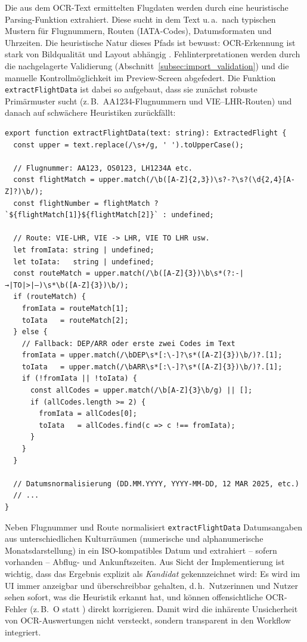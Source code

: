 Die aus dem OCR-Text ermittelten Flugdaten werden durch eine heuristische Parsing-Funktion extrahiert.
Diese sucht in dem Text u.\,a.\ nach typischen Mustern für Flugnummern, Routen (IATA-Codes), Datumsformaten und Uhrzeiten.
Die heuristische Natur dieses Pfads ist bewusst: OCR-Erkennung ist stark von Bildqualität und Layout abhängig \cite{mlKitTextRecognition,tesseractOcr}.
Fehlinterpretationen werden durch die nachgelagerte Validierung (Abschnitt~\ref{subsec:import_validation}) und die manuelle Kontrollmöglichkeit im Preview-Screen abgefedert.
Die Funktion \texttt{extractFlightData} ist dabei so aufgebaut, dass sie zunächst robuste Primärmuster sucht (z.\,B.\ \glqq AA1234\grqq{}-Flugnummern und \glqq VIE--LHR\grqq{}-Routen) und danach auf schwächere Heuristiken zurückfällt:

\begin{lstlisting}[caption={Heuristische Extraktion von Flugdaten aus OCR-Text (services/ocr.ts)},label={lst:extract_flight_data}]
export function extractFlightData(text: string): ExtractedFlight {
  const upper = text.replace(/\s+/g, ' ').toUpperCase();

  // Flugnummer: AA123, OS0123, LH1234A etc.
  const flightMatch = upper.match(/\b([A-Z]{2,3})\s?-?\s?(\d{2,4}[A-Z]?)\b/);
  const flightNumber = flightMatch ? `${flightMatch[1]}${flightMatch[2]}` : undefined;

  // Route: VIE-LHR, VIE -> LHR, VIE TO LHR usw.
  let fromIata: string | undefined;
  let toIata:   string | undefined;
  const routeMatch = upper.match(/\b([A-Z]{3})\b\s*(?:-|→|TO|>|–)\s*\b([A-Z]{3})\b/);
  if (routeMatch) {
    fromIata = routeMatch[1];
    toIata   = routeMatch[2];
  } else {
    // Fallback: DEP/ARR oder erste zwei Codes im Text
    fromIata = upper.match(/\bDEP\s*[:\-]?\s*([A-Z]{3})\b/)?.[1];
    toIata   = upper.match(/\bARR\s*[:\-]?\s*([A-Z]{3})\b/)?.[1];
    if (!fromIata || !toIata) {
      const allCodes = upper.match(/\b[A-Z]{3}\b/g) || [];
      if (allCodes.length >= 2) {
        fromIata = allCodes[0];
        toIata   = allCodes.find(c => c !== fromIata);
      }
    }
  }

  // Datumsnormalisierung (DD.MM.YYYY, YYYY-MM-DD, 12 MAR 2025, etc.)
  // ...
}
\end{lstlisting}

Neben Flugnummer und Route normalisiert \texttt{extractFlightData} Datumsangaben aus unterschiedlichen Kulturräumen (numerische und alphanumerische Monatsdarstellung) in ein ISO-kompatibles Datum und extrahiert -- sofern vorhanden -- Abflug- und Ankunftszeiten.
Aus Sicht der Implementierung ist wichtig, dass das Ergebnis explizit als \emph{Kandidat} gekennzeichnet wird:
Es wird im UI immer anzeigbar und überschreibbar gehalten, d.\,h.\ Nutzerinnen und Nutzer sehen sofort, was die Heuristik erkannt hat, und können offensichtliche OCR-Fehler (z.\,B.\ \glqq O\grqq{} statt \grqq{}) direkt korrigieren.
Damit wird die inhärente Unsicherheit von OCR-Auswertungen nicht versteckt, sondern transparent in den Workflow integriert.

